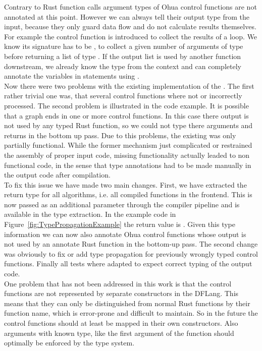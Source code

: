 Contrary to Rust function calls argument types of Ohua control functions are not annotated at this point. However we can always tell their output type from the input, because they only guard data flow and do not calculate results themselves. For example the  control function is introduced to collect the results of a loop. We know its signature has to be , to collect a given number of arguments of type  before returning a list of type \code{[A]}. If the output list is used by another function downstream, we already know the type  from the context and can completely annotate the variables in statements using .\\

Now there were two problems with the existing implementation of the . The first rather trivial one was, that several control functions where not or incorrectly processed. The second problem is illustrated in the  code example. It is possible that a graph ends in one or more control functions. In this case there output is not used by any typed Rust function, so we could not type there arguments and returns in the bottom up pass. Due to this problems, the existing  was only partially functional. While the former  mechanism just complicated or restrained the assembly of proper input code, missing  functionality actually leaded to non functional code, in the sense that type annotations had to be made manually in the output code after compilation.  \\

To fix this issue we have made two main changes. First, we have extracted the return type for all algorithms, i.e. all compiled functions in the frontend. This is now passed as an additional parameter through the compiler pipeline and is available in the type extraction. In the example code in Figure~\ref{fig:TypePropagationExample} the return value is . Given this type information we can now also annotate Ohua control functions whose output is not used by an annotate Rust function in the bottom-up pass. The second change was obviously to fix or add type propagation for previously wrongly typed control functions. Finally all tests where adapted to expect correct typing of the output code. \\

One problem that has not been addressed in this work is that the control functions are not represented by separate constructors in the DFLang. This means that they can only be distinguished from normal Rust functions by their function name, which is error-prone and difficult to maintain. So in the future the control functions should at least be mapped in their own constructors. Also arguments with known type, like the first argument of the function  should optimally be enforced by the type system. 

